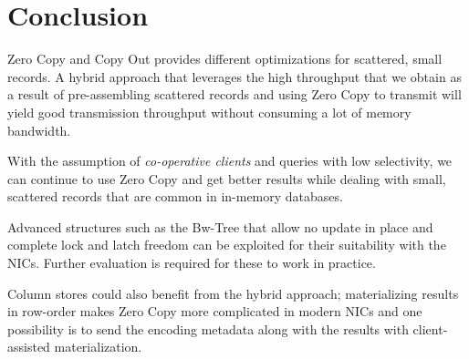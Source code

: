 \section{Conclusion}
Zero Copy and Copy Out provides different optimizations for scattered, small records. A hybrid approach 
that leverages the high throughput that we obtain as a result of pre-assembling scattered records and 
using Zero Copy to transmit will yield good transmission throughput without consuming a lot of memory bandwidth.
\begin{myitemize}
\item With the assumption of {\em co-operative clients} and queries with low selectivity, we can continue 
to use Zero Copy and get better results while dealing with small, scattered records that are common in in-memory databases.
\item Advanced structures such as the Bw-Tree that allow no update in place and complete lock and latch freedom 
can be exploited for their suitability with the NICs. Further evaluation is required for these to work in practice.
\item Column stores could also benefit from the hybrid approach; materializing results in row-order makes Zero Copy 
more complicated in modern NICs and one possibility is to send the encoding metadata along with the results with client-assisted 
materialization.
\end{myitemize}
\newpage




